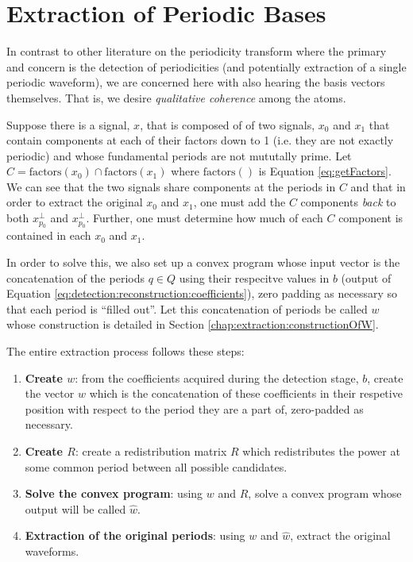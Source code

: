 \chapter{Extraction of Periodic Bases}\label{chap:extraction}

In contrast to other literature on the periodicity transform where the primary and concern is the detection of periodicities (and potentially extraction of a single periodic waveform), we are concerned here with also hearing the basis vectors themselves. That is, we desire \emph{qualitative coherence} among the atoms.

Suppose there is a signal, $x$, that is composed of of two signals, $x_0$ and $x_1$ that contain components at each of their factors down to 1 (i.e. they are not exactly periodic) and whose fundamental periods are not mututally prime. Let $C = \text{factors}(x_0) \cap \text{factors}(x_1)$ where $\text{factors}()$ is Equation \eqref{eq:getFactors}. We can see that the two signals share components at the periods in $C$ and that in order to extract the original $x_0$ and $x_1$, one must add the $C$ components \emph{back} to both $x_{p_0}^{\perp}$ and $x_{p_0}^{\perp}$. Further, one must determine how much of each $C$ component is contained in each $x_0$ and $x_1$.

In order to solve this, we also set up a convex program whose input vector is the concatenation of the periods $q \in Q$ using their respecitve values in $b$ (output of Equation \eqref{eq:detection:reconstruction:coefficients}), zero padding as necessary so that each period is ``filled out''. Let this concatenation of periods be called $w$ whose construction is detailed in Section \ref{chap:extraction:constructionOfW}.

The entire extraction process follows these steps:
\begin{enumerate}
    \item \textbf{Create $w$}: from the coefficients acquired during the detection stage, $b$, create the vector $w$ which is the concatenation of these coefficients in their respetive position with respect to the period they are a part of, zero-padded as necessary.
    \item \textbf{Create $R$}: create a redistribution matrix $R$ which redistributes the power at some common period between all possible candidates.
    \item \textbf{Solve the convex program}: using $w$ and $R$, solve a convex program whose output will be called $\hat{w}$.
    \item \textbf{Extraction of the original periods}: using $w$ and $\hat{w}$, extract the original waveforms.
\end{enumerate}

